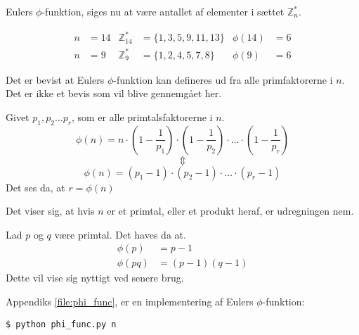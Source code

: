 \begin{definition}
    Eulers \(\phi\)-funktion, siges nu at være antallet af elementer i sættet \(\mathbb{Z}_n^*\).
\end{definition}

\begin{eks}
    \mbox{}\vspace*{-1.5em}
    \begin{align*}
        n &= 14 & \mathbb{Z}_{14}^*  &= \{1, 3, 5, 9, 11, 13 \} & \phi(14) &= 6\\
        n &= 9  & \mathbb{Z}_9^*     &= \{1, 2, 4, 5, 7, 8\}    & \phi(9)  &= 6
    \end{align*}
\end{eks}

Det er bevist at Eulers \(\phi\)-funktion kan defineres ud fra alle primfaktorerne i \(n\).
Det er ikke et bevis som vil blive gennemgået her.

\begin{sent}
    Givet \(p_1, p_2 \hdots p_r\), som er alle primtalsfaktorerne i \(n\).
    \[\phi(n) = n \cdot \left(1-\frac{1}{p_1}\right) \cdot \left(1-\frac{1}{p_2}\right) \cdot \hdots \cdot \left(1-\frac{1}{p_r}\right)\]
    \[\Updownarrow\]
    \[\phi(n) = (p_1 - 1) \cdot (p_2 - 1) \cdot \hdots \cdot (p_r - 1)\]
    Det ses da, at \(r = \phi(n)\)
\end{sent}

Det viser sig, at hvis \(n\) er et primtal, eller et produkt heraf, er udregningen nem.

\begin{eks}
    Lad \(p\) og \(q\) være primtal. Det haves da at.
    \begin{align}
        \phi(p)   &= p - 1\\
        \phi(p q) &= (p - 1)(q - 1)
    \end{align}
    Dette vil vise sig nyttigt ved senere brug.
\end{eks}

Appendiks \ref{file:phi_func}, er en implementering af Eulers \(\phi\)-funktion:
\begin{verbatim}
$ python phi_func.py n
\end{verbatim}




